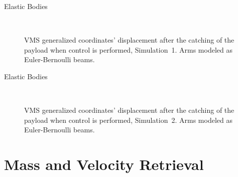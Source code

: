 \begin{frame}{Elastic Bodies}
  \begin{figure}
      \centering
      \subfloat
      {} \quad
    \subfloat
      {} \quad
      \subfloat
      {} \\
      \subfloat
      {} \quad
      \subfloat
      {} \quad
      \subfloat
      {} 
      \caption{VMS generalized coordinates’ displacement after the catching of the payload when control is performed, Simulation~1. Arms modeled as Euler-Bernoulli beams.}
    \end{figure}
\end{frame}

\begin{frame}{Elastic Bodies}
  \begin{figure}
      \centering
      \subfloat
      {} \quad
    \subfloat
      {} \quad
      \subfloat
      {} \\
      \subfloat
      {} \quad
      \subfloat
      {} \quad
      \subfloat
      {} 
      \caption{VMS generalized coordinates’ displacement after the catching of the payload when control is performed, Simulation~2. Arms modeled as Euler-Bernoulli beams.}
    \end{figure}
\end{frame}

\section{Mass and Velocity Retrieval}

